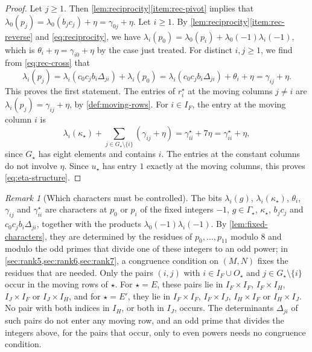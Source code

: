 \documentclass[12pt,oneside,openany]{book}
\theoremstyle{definition}
\theoremstyle{plain}
\numberwithin{equation}{chapter}
\theoremstyle{plain}
\theoremstyle{definition}
\theoremstyle{remark}
\newtheorem{remark}[remark]{Remark}
\begin{document}
\begin{proof}
Let $j\ge1$. Then \cref{lem:reciprocity}\ref{item:rec-pivot} implies that $\lambda_0(p_j)=\lambda_0(b_jc_j)+\eta=\gamma_{0j}+\eta$. Let $i\ge1$. By \cref{lem:reciprocity}\ref{item:rec-reverse} and \eqref{eq:reciprocity}, we have $\lambda_i(p_0)=\lambda_0(p_i)+\lambda_0(-1)\lambda_i(-1)$, which is $\theta_i+\eta=\gamma_{i0}+\eta$ by the case just treated. For distinct $i,j\ge1$, we find from \eqref{eq:rec-cross} that
\begin{equation}
\lambda_i(p_j)=\lambda_i(c_0c_jb_i\Delta_{ji})+\lambda_i(p_0)=\lambda_i(c_0c_jb_i\Delta_{ji})+\theta_i+\eta=\gamma_{ij}+\eta.
\end{equation}
This proves the first statement. The entries of $r^\star_i$ at the moving columns $j\ne i$ are $\lambda_i(p_j)=\gamma_{ij}+\eta$, by \cref{def:moving-rows}. For $i\in I_F$, the entry at the moving column $i$ is
\begin{equation}
\lambda_i(\kappa_\star)+\sum_{j\in G_\star\setminus\{i\}}(\gamma_{ij}+\eta)=\gamma^\star_{ii}+7\eta=\gamma^\star_{ii}+\eta,
\end{equation}
since $G_\star$ has eight elements and contains $i$. The entries at the constant columns do not involve $\eta$. Since $u_\star$ has entry $1$ exactly at the moving columns, this proves \eqref{eq:eta-structure}.
\end{proof}

\begin{remark}[Which characters must be controlled]\label{rem:constant-characters}
The bits $\lambda_i(g)$, $\lambda_i(\kappa_\star)$, $\theta_i$, $\gamma_{ij}$ and $\gamma^\star_{ii}$ are characters at $p_0$ or $p_i$ of the fixed integers $-1$, $g\in\Gamma_\star$, $\kappa_\star$, $b_jc_j$ and $c_0c_jb_i\Delta_{ji}$, together with the products $\lambda_0(-1)\lambda_i(-1)$. By \cref{lem:fixed-characters}, they are determined by the residues of $p_0,\dots,p_{11}$ modulo $8$ and modulo the odd primes that divide one of these integers to an odd power; in \cref{sec:rank5,sec:rank6,sec:rank7}, a congruence condition on $(M,N)$ fixes the residues that are needed. Only the pairs $(i,j)$ with $i\in I_F\cup O_\star$ and $j\in G_\star\setminus\{i\}$ occur in the moving rows of $\star$. For $\star=E$, these pairs lie in $I_F\times I_F$, $I_F\times I_H$, $I_J\times I_F$ or $I_J\times I_H$, and for $\star=E'$, they lie in $I_F\times I_F$, $I_F\times I_J$, $I_H\times I_F$ or $I_H\times I_J$. No pair with both indices in $I_H$, or both in $I_J$, occurs. The determinants $\Delta_{ji}$ of such pairs do not enter any moving row, and an odd prime that divides the integers above, for the pairs that occur, only to even powers needs no congruence condition.
\end{remark}
\end{document}
